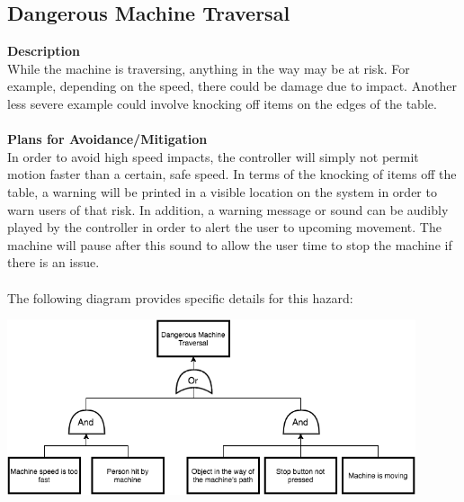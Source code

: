 \documentclass[titlepage]{article}
\begin{document}
\subsection{Dangerous Machine Traversal}
\textbf{Description}\\
While the machine is traversing, anything in the way may be at risk. For example, depending on the speed, there could be damage due to impact. Another less severe example could involve knocking off items on the edges of the table.\\~\\
\textbf{Plans for Avoidance/Mitigation}\\
In order to avoid high speed impacts, the controller will simply not permit motion faster than a certain, safe speed. In terms of the knocking of items off the table, a warning will be printed in a visible location on the system in order to warn users of that risk. In addition, a warning message or sound can be audibly played by the controller in order to alert the user to upcoming movement. The machine will pause after this sound to allow the user time to stop the machine if there is an issue.\\~\\
The following diagram provides specific details for this hazard:
\begin{center}
	\includegraphics[width=0.9\textwidth]{DangerousTraversalFTA.png}
\label{fig:yRailFig}
\end{center}

\newpage
\end{document}
